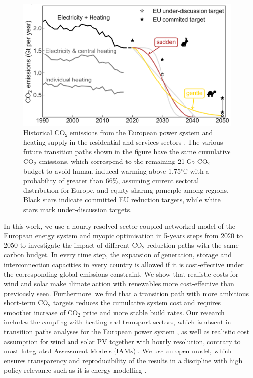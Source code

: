 \documentclass[5p]{elsarticle} %
\begin{document}
\begin{figure}[!h]
\centering
	\includegraphics[width=\columnwidth]{figures/carbon_budget.png}
\caption{Historical CO$_2$ emissions from the European power system and heating supply in the residential and services sectors \cite{UNFCCC_inventory}. The various future transition paths shown in the figure have the same cumulative CO$_2$ emissions, which correspond to the remaining 21 Gt CO$_2$ budget to avoid human-induced warming above 1.75$^{\circ}$C with a probability of greater than 66\%, assuming current sectoral distribution for Europe, and equity sharing principle among regions. Black stars indicate committed EU reduction targets, while white stars mark under-discussion targets.} \label{fig_carbon_budget} 
\end{figure}

In this work, we use a hourly-resolved sector-coupled networked model of the European energy system and myopic optimisation in 5-years steps from 2020 to 2050 to investigate the impact of different CO$_2$ reduction paths with the same carbon budget. In every time step, the expansion of generation, storage and interconnection capacities in every country is allowed if it is cost-effective under the corresponding global emissions constraint. We show that realistic costs for wind and solar make climate action with renewables more cost-effective than previously seen. Furthermore, we find that a transition path with more ambitious short-term CO$_2$ targets reduces the cumulative system cost and requires smoother increase of CO$_2$ price and more stable build rates. Our research includes the coupling  with heating and transport sectors, which is absent in transition paths analyses for the European power system \cite{Plesmann_2017, Gerbaulet_2019, Poncelet_2016}, as well as realistic cost assumption for wind and solar PV together with hourly resolution, contrary to most Integrated Assessment Models (IAMs) \textcolor[rgb]{1,0,0}{\cite{Creutzig_2017}}. We use an open model, which ensures transparency and reproducibility of the results in a  discipline with high policy relevance such as it is energy modelling \cite{Pfenninger_2017, Pfenninger_2018}.
\end{document}
